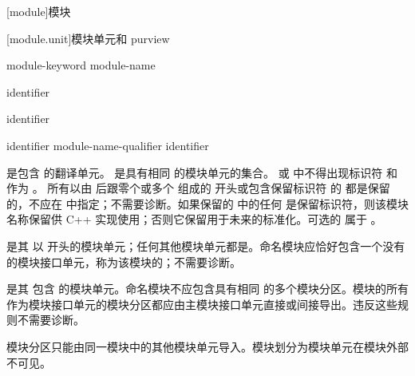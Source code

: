 [module]{模块}%


[module.unit]{模块单元和 purview}

\begin{bnf}
\br
     module-keyword module-name   \terminal{;}
\end{bnf}

\begin{bnf}
\br
     identifier
\end{bnf}

\begin{bnf}
\br
    \terminal{:}  identifier
\end{bnf}

\begin{bnf}
\br
    identifier \br
    module-name-qualifier identifier 
\end{bnf}

\pnum
{}是包含  的翻译单元。 是具有相同  的模块单元的集合。 或  中不得出现标识符  和  作为 。
%
所有以由  后跟零个或多个  组成的  开头或包含保留标识符 的  都是保留的，不应在  中指定；不需要诊断。如果保留的  中的任何  是保留标识符，则该模块名称保留供 C++ 实现使用；否则它保留用于未来的标准化。可选的  属于 。

\pnum
{}是其  以  开头的模块单元；任何其他模块单元都是。命名模块应恰好包含一个没有  的模块接口单元，称为该模块的；不需要诊断。

\pnum
{}是其  包含  的模块单元。命名模块不应包含具有相同  的多个模块分区。模块的所有作为模块接口单元的模块分区都应由主模块接口单元直接或间接导出。违反这些规则不需要诊断。
\begin{note}
模块分区只能由同一模块中的其他模块单元导入。模块划分为模块单元在模块外部不可见。
\end{note}

